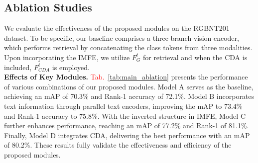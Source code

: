 \subsection{Ablation Studies}
We evaluate the effectiveness of the proposed modules on the RGBNT201 dataset. 
%
To be specific, our baseline comprises a three-branch vision encoder, which performs retrieval by concatenating the class tokens from three modalities. 
%
Upon incorporating the IMFE, we utilize \( F^{t}_{G} \) for retrieval and when the CDA is included, \( F^{t}_{CDA} \) is employed.
\\
\textbf{Effects of Key Modules.}
\textcolor{red}{Tab.}~\ref{tab:main_ablation} presents the performance of various combinations of our proposed modules. 
%
Model A serves as the baseline, achieving an mAP of 70.3\% and Rank-1 accuracy of 72.1\%.
%
Model B incorporates text information through parallel text encoders, improving the mAP to 73.4\% and Rank-1 accuracy to 75.8\%. 
%
With the inverted structure in IMFE, Model C further enhances performance, reaching an mAP of 77.2\% and Rank-1 of 81.1\%. 
%
Finally, Model D integrates CDA, delivering the best performance with an mAP of 80.2\%.
%
These results fully validate the effectiveness and efficiency of the proposed modules.
